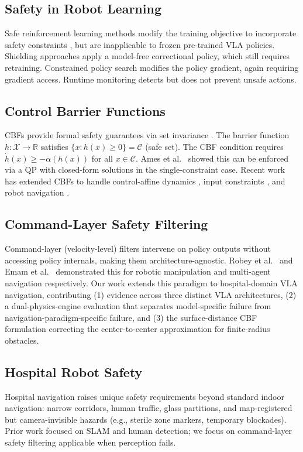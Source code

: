 \documentclass[letterpaper]{article}
\begin{document}
\subsection{Safety in Robot Learning}
Safe reinforcement learning methods modify the training objective to
incorporate safety constraints \cite{garcia2015survey}, but are
inapplicable to frozen pre-trained VLA policies. Shielding approaches
\cite{alshiekh2018safe} apply a model-free correctional policy, which
still requires retraining. Constrained policy search \cite{achiam2017cpo}
modifies the policy gradient, again requiring gradient access.
Runtime monitoring \cite{falcone2011monitoring} detects but does not
prevent unsafe actions.

\subsection{Control Barrier Functions}
CBFs provide formal safety guarantees via set invariance
\cite{ames2019cbf}. The barrier function $h : \mathcal{X} \to \mathbb{R}$
satisfies $\{x : h(x) \geq 0\} = \mathcal{C}$ (safe set). The CBF
condition requires $\dot{h}(x) \geq -\alpha(h(x))$ for all $x \in \mathcal{C}$.
Ames et al.\ \cite{ames2017cbf} showed this can be enforced via a QP
with closed-form solutions in the single-constraint case. Recent work has
extended CBFs to handle control-affine dynamics \cite{xiao2021high},
input constraints \cite{rauscher2016cbf}, and robot navigation
\cite{wang2017safe}.

\subsection{Command-Layer Safety Filtering}
Command-layer (velocity-level) filters intervene on policy outputs
without accessing policy internals, making them architecture-agnostic.
Robey et al.\ \cite{robey2021cbf} and Emam et al.\ \cite{emam2022cbf}
demonstrated this for robotic manipulation and multi-agent navigation
respectively. Our work extends this paradigm to hospital-domain VLA
navigation, contributing (1) evidence across three distinct VLA
architectures, (2) a dual-physics-engine evaluation that separates
model-specific failure from navigation-paradigm-specific failure,
and (3) the surface-distance CBF formulation correcting the center-to-center
approximation for finite-radius obstacles.

\subsection{Hospital Robot Safety}
Hospital navigation raises unique safety requirements beyond standard
indoor navigation: narrow corridors, human traffic, glass partitions,
and map-registered but camera-invisible hazards (e.g., sterile zone
markers, temporary blockades). Prior work \cite{ozkil2009service,
cardinaux2011video} focused on SLAM and human detection; we focus on
command-layer safety filtering applicable when perception fails.
\end{document}
